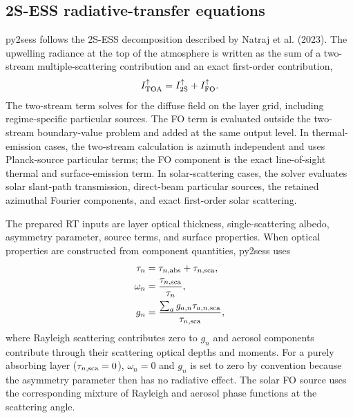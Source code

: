 \documentclass[gmd, manuscript]{copernicus}
\begin{document}
\subsection{2S-ESS radiative-transfer equations}

py2sess follows the 2S-ESS decomposition described by Natraj et al. (2023).  The
upwelling radiance at the top of the atmosphere is written as the sum of a two-stream
multiple-scattering contribution and an exact first-order contribution,
\begin{equation}
  I_{\rm TOA}^{\uparrow}
  =
  I_{\rm 2S}^{\uparrow}
  +
  I_{\rm FO}^{\uparrow}.
  \label{eq:rt_decomposition}
\end{equation}
The two-stream term solves for the diffuse field on the layer grid, including
regime-specific particular sources.  The FO term is evaluated outside the two-stream
boundary-value problem and added at the same output level.  In thermal-emission cases,
the two-stream calculation is azimuth independent and uses Planck-source particular
terms; the FO component is the exact line-of-sight thermal and surface-emission term.
In solar-scattering cases, the solver evaluates solar slant-path transmission,
direct-beam particular sources, the retained azimuthal Fourier components, and exact
first-order solar scattering.

The prepared RT inputs are layer optical thickness, single-scattering albedo,
asymmetry parameter, source terms, and surface properties.  When optical properties are
constructed from component quantities, py2sess uses
\begin{align}
  \tau_n &= \tau_{n,{\rm abs}} + \tau_{n,{\rm sca}}, \\
  \omega_n &= \frac{\tau_{n,{\rm sca}}}{\tau_n}, \\
  g_n &=
  \frac{\sum_a g_{a,n}\tau_{a,n,{\rm sca}}}
       {\tau_{n,{\rm sca}}},
  \label{eq:optical_inputs}
\end{align}
where Rayleigh scattering contributes zero to $g_n$ and aerosol components contribute
through their scattering optical depths and moments.  For a purely absorbing layer
($\tau_{n,{\rm sca}}=0$), $\omega_n=0$ and $g_n$ is set to zero by convention because
the asymmetry parameter then has no radiative effect.  The solar FO source uses the
corresponding mixture of Rayleigh and aerosol phase functions at the scattering angle.
\end{document}
